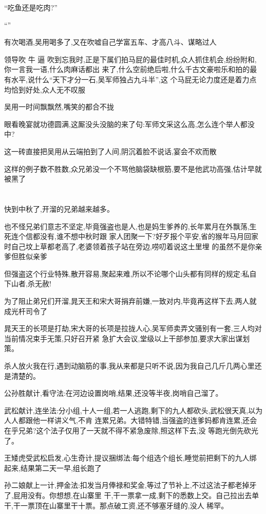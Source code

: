 ﻿\documentclass[12pt]{article}
\begin{document}
``吃鱼还是吃肉?''

``\dldots ''

有次喝酒,吴用喝多了,又在吹嘘自己学富五车、才高八斗、谋略过人\dldots

领导吹 牛 逼 吹到忘我时,正是下属们拍马屁的最佳时机,众人抓住机会,纷纷附和,你一言我一语,什么肉麻话都出
来了,什么空前绝后啦,什么千古文豪啦\dldots 乐和拍的最有水平,说什么``天下才分一石,吴军师独占九斗半'',这
个马屁无论力度还是着力点均恰到好处,众人无不叹服

吴用一时间飘飘然,嘴笑的都合不拢\dldots

眼看晚宴就功德圆满,这厮没头没脑的来了句:军师文采这么高,怎么连个举人都没中?

这一砖直接把吴用从云端拍到了人间,阴沉着脸不说话,宴会不欢而散\dldots

这样的例子数不胜数,众兄弟没一个不骂他脑袋缺根筋,要不是他武功高强,估计早就被黑了

\section{}

快到中秋了,开溜的兄弟越来越多。

也不怪兄弟们意志不坚定,毕竟强盗也是人,也是妈生爹养的,长年累月在外飘荡,生死连个信都没有,谁不想中秋时跟
家人团聚一下?好歹报个平安,省的猴年马月回家时自己坟上草都老高了,老婆领着孩子站在旁边,唠叨着说这土里埋
的虽然不是你亲爹但胜似亲爹\dldots

但强盗这个行业特殊,散开容易,聚起来难,所以不论哪个山头都有同样的规定:私自下山者,杀无赦!

为了阻止弟兄们开溜,晁天王和宋大哥捐弃前嫌,一致对内,毕竟再这样下去,两人就成光杆司令了

晁天王的长项是打劫,宋大哥的长项是拉拢人心,吴军师卖弄文骚别有一套,三人均对当前情况束手无策,只好召开紧
急扩大会议,堂级以上干部参加,要求大家出谋划策。

杀人放火我在行,遇到动脑筋的事,我从来都是只听不说,因为我自己几斤几两心里还是清楚的。

公孙胜献计,看守法:在河边设置岗哨,结果,还没等半夜,岗哨自己溜了。

武松献计,连坐法:分小组,十人一组,若一人逃跑,剩下的九人都砍头,武松很天真,以为人人都跟他一样讲义气,不肯
连累兄弟。大错特错,当强盗的连爹妈都肯连累,还会在乎兄弟?这个法子仅用了一天就不得不紧急废除,照这样下去,没
等跑光倒先砍光了。

王矮虎受武松启发,心生奇计,提议捆绑法:每个组选个组长,睡觉前把剩下的九人绑起来,结果第二天一早,组长跑了
\dldots

孙二娘献上一计,押金法:扣发当月俸禄和奖金,等过了节补上,不过这法子都老掉牙了,屁用没有。你想想,在山寨里
干,干一票拿一成,剩下的悉数上交。自己拉出去单干,干一票顶在山寨里干十票。那点破工资,还不够塞牙缝的,没人
稀罕。
\end{document}

